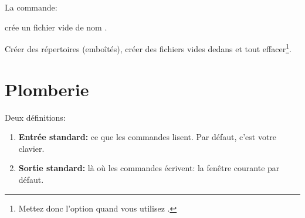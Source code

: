 La commande:


crée un fichier vide de nom .

Créer des répertoires (emboîtés), créer des fichiers vides dedans et
tout effacer\footnote{Mettez donc l'option  quand vous
  utilisez .}. 

\section{Plomberie}
Deux définitions:
\begin{enumerate}
  \item \textbf{Entrée standard:} ce que les commandes lisent. Par défaut, c'est
    votre clavier.
  \item \textbf{Sortie standard:} là où les commandes écrivent: la fenêtre
    courante par défaut.
\end{enumerate}

